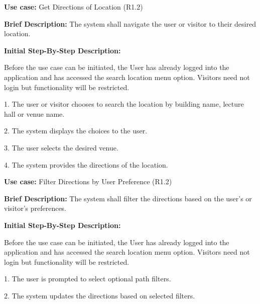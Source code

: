 \documentclass{article}
\begin{document}
    \begin{flushleft}
    \textbf{Use case:} Get Directions of Location (R1.2)
    \newline
    	
    \textbf{Brief Description:}
    \newline
    The system shall navigate the user or visitor to their desired location.
    \newline
    
    \textbf{Initial Step-By-Step Description:}
    
    Before the use case can be initiated, the User has already logged into the application and has accessed the search location menu option. Visitors need not login but functionality will be restricted.
	\newline    
	
1. The user or visitor chooses to search the location by building name, lecture hall or venue name.

2. The system displays the choices to the user.

3. The user selects the desired venue. 

4. The system provides the directions of the location.

\end{flushleft}
    
    \begin{flushleft}
    \textbf{Use case:} Filter Directions by User Preference (R1.2)
    \newline
    	
    \textbf{Brief Description:}
    \newline
    The system shall filter the directions based on the user's or visitor's preferences.
    \newline
    
    \textbf{Initial Step-By-Step Description:}
    
    Before the use case can be initiated, the User has already logged into the application and has accessed the search location menu option. Visitors need not login but functionality will be restricted.
	\newline    
	
1. The user is prompted to select optional path filters.

2. The system updates the directions based on selected filters.


\end{flushleft}
    
\end{document}
